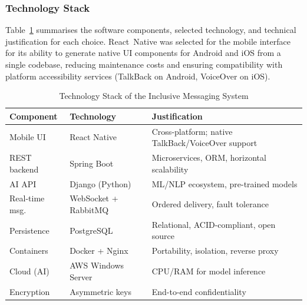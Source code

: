 \documentclass[journal]{IEEEtran}
\begin{document}
	\subsubsection{Technology Stack}
	Table~\ref{tab:stack} summarises the software components,
	selected technology, and technical justification for each choice.
	React~Native was selected for the mobile interface for its ability
	to generate native UI components for Android and iOS from a single
	codebase, reducing maintenance costs and ensuring compatibility
	with platform accessibility services (TalkBack on Android,
	VoiceOver on iOS).
	
	\begin{table}[!t]
		\caption{Technology Stack of the Inclusive Messaging System}
		\label{tab:stack}
		\centering
		\scriptsize
		\renewcommand{\arraystretch}{1.25}
		\begin{tabular}{p{1.8cm}p{1.8cm}p{3.3cm}}
			\toprule
			\textbf{Component} & \textbf{Technology} & \textbf{Justification} \\
			\midrule
			Mobile UI      & React Native   & Cross-platform; native TalkBack/VoiceOver support \\
			REST backend   & Spring Boot    & Microservices, ORM, horizontal scalability \\
			AI API         & Django (Python)& ML/NLP ecosystem, pre-trained models \\
			Real-time msg. & WebSocket + RabbitMQ & Ordered delivery, fault tolerance \\
			Persistence    & PostgreSQL     & Relational, ACID-compliant, open source \\
			Containers     & Docker + Nginx & Portability, isolation, reverse proxy \\
			Cloud (AI)     & AWS Windows Server & CPU/RAM for model inference \\
			Encryption     & Asymmetric keys & End-to-end confidentiality \\
			\bottomrule
		\end{tabular}
	\end{table}
	
\end{document}
